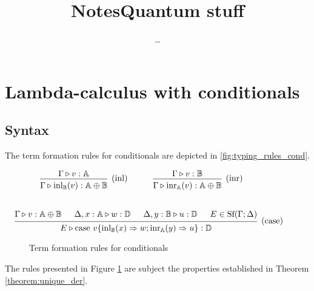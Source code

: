 \documentclass[10pt,a4paper]{amsart}
\author{\dots}
\title{Notes}
\theoremstyle{definition}
\theoremstyle{definition}
\theoremstyle{definition}
\theoremstyle{definition}
\theoremstyle{definition}
\theoremstyle{definition}
\begin{document}
\title{Quantum stuff}
\maketitle
\section{Lambda-calculus with conditionals}

\subsection{Syntax}

The term formation rules for conditionals are depicted in \autoref{fig:typing_rules_cond}. 


\begin{figure}[H]
    \begin{equation*}
    \begin{aligned}
    &\hspace{10pt}
    \begin{prooftree}
    \hypo{\Gamma \triangleright v: \mathbb{A}}
    \infer1[(inl)]{\Gamma \triangleright \text{inl}_{\mathbb{B}}(v): \mathbb{A} \oplus \mathbb{B}}
    \end{prooftree}
    \hspace{30pt}
    \begin{prooftree}
    \hypo{\Gamma \triangleright v: \mathbb{B}}
    \infer1[(inr)]{\Gamma \triangleright \text{inr}_{\mathbb{A}}(v): \mathbb{A} \oplus \mathbb{B}}
    \end{prooftree} \\[20pt]
    &\hspace{-20pt}
    \begin{prooftree}
    \hypo{\Gamma \triangleright v: \mathbb{A} \oplus \mathbb{B}}
    \hypo{\Delta, x: \mathbb{A} \triangleright w: \mathbb{D}}
    \hypo{\Delta, y: \mathbb{B} \triangleright u: \mathbb{D}}
    \hypo{E \in \text{Sf}(\Gamma; \Delta)}
    \infer4[(case)]{E \triangleright \text{case } v \{\text{inl}_{\mathbb{B}}(x) \Rightarrow w ; \text{inr}_{\mathbb{A}}(y) \Rightarrow u\}: \mathbb{D}}
    \end{prooftree}
    \end{aligned}
    \end{equation*}
    \caption{Term formation rules for conditionals}
    \label{fig:typing_rules_cond}
    \end{figure}


The rules presented in Figure \ref{fig:typing_rules_cond} are subject 
the properties established in Theorem \autoref{theorem:unique_der}.
\end{document}
